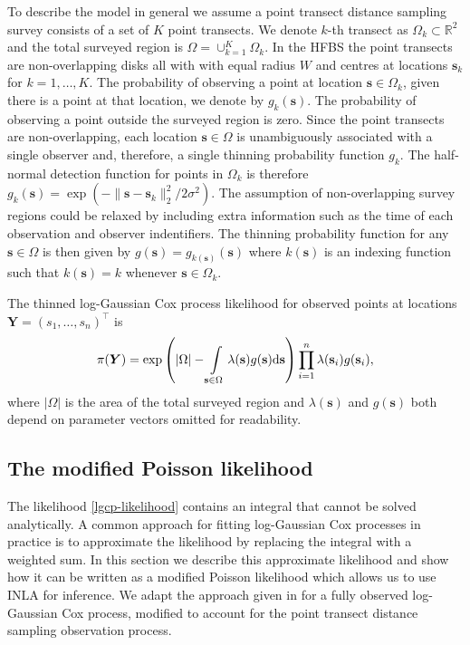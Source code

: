 \documentclass{statsoc}
\newcommand{\bs}{\mathbf{s}}
\newcommand{\bm}{\boldsymbol}  %
\begin{document}
To describe the model in general we assume a point transect distance sampling survey consists of a set of $K$ point transects.   We denote $k$-th transect as $\Omega_k \subset \mathbb{R}^2$ and the total surveyed region is $\Omega = \cup_{k=1}^K \Omega_k$.  In the HFBS the point transects are non-overlapping disks all with with equal radius $W$ and centres at locations $\bs_k$ for $k = 1, \ldots, K$.  The probability of observing a point at location $\bs \in \Omega_k$, given there is a point at that location, we denote by $g_k(\bs)$.  The probability of observing a point outside the surveyed region is zero.
Since the point transects are non-overlapping, each location $\bs \in \Omega$ is unambiguously associated with a single observer and, therefore, a single thinning probability function $g_k$.   The half-normal detection function for points in $\Omega_k$ is therefore $g_k(\bs) = \exp(-\lVert \bs - \bs_k \rVert_2^2 / 2\sigma^2)$.  The assumption of non-overlapping survey regions could be relaxed by including extra information such as the time of each observation and observer indentifiers.  The thinning probability function for any $\bs \in \Omega$ is then given by $g(\bs) = g_{k(\bs)}(\bs)$ where $k(\bs)$ is an indexing function such that $k(\bs) = k$ whenever $\bs \in \Omega_k$.

The thinned log-Gaussian Cox process likelihood for observed points at locations $\bm{Y} = (s_1, \ldots, s_n)^\intercal$ is
\begin{equation}
\label{lgcp-likelihood}
\pi(\bm{Y}) = \exp\left( |\Omega| -\int\displaylimits_{\bs \in \Omega} \lambda(\bs) g(\bs) \mathrm{d}\bs \right)\prod_{i=1}^n \lambda(\bs_i)g(\bs_i),
\end{equation}
where $|\Omega|$ is the area of the total surveyed region and $\lambda(\bs)$ and $g(\bs)$ both depend on parameter vectors omitted for readability.  

\subsection{The modified Poisson likelihood}
\label{sec-lgcp}

\sloppy The likelihood \eqref{lgcp-likelihood} contains an integral that cannot be solved analytically.  A common approach for fitting log-Gaussian Cox processes in practice is to approximate the likelihood by replacing the integral with a weighted sum.  In this section we describe this approximate likelihood and show how it can be written as a modified Poisson likelihood which allows us to use INLA for inference.  We adapt the approach given in \cite{simpson_going_2016} for a fully observed log-Gaussian Cox process, modified to account for the point transect distance sampling observation process.
\end{document}
